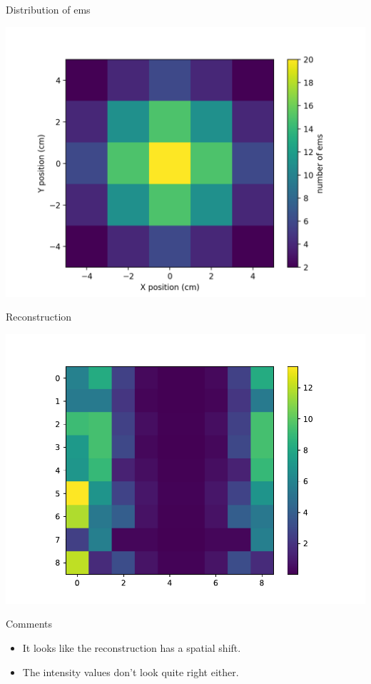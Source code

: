 \documentclass[dvipsnames]{beamer}
\begin{document}
\begin{frame}{Distribution of ems}
\begin{center}
\includegraphics[height=0.8\textheight]{dist}
\end{center}
\end{frame}

\begin{frame}{Reconstruction}
\begin{center}
\includegraphics[height=0.8\textheight]{reconstruction}
\end{center}
\end{frame}

\begin{frame}{Comments}
\begin{itemize}
\item It looks like the reconstruction has a spatial shift.
\item The intensity values don't look quite right either.
\end{itemize}
\end{frame}
\end{document}
